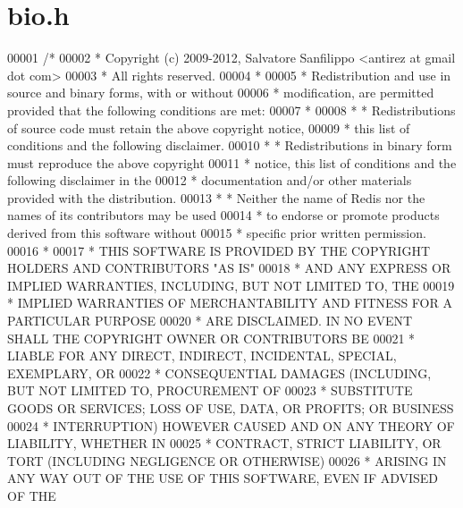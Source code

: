 \hypertarget{bio_8h_source}{}\section{bio.\+h}
\label{bio_8h_source}

\begin{DoxyCode}
00001 \textcolor{comment}{/*}
00002 \textcolor{comment}{ * Copyright (c) 2009-2012, Salvatore Sanfilippo <antirez at gmail dot com>}
00003 \textcolor{comment}{ * All rights reserved.}
00004 \textcolor{comment}{ *}
00005 \textcolor{comment}{ * Redistribution and use in source and binary forms, with or without}
00006 \textcolor{comment}{ * modification, are permitted provided that the following conditions are met:}
00007 \textcolor{comment}{ *}
00008 \textcolor{comment}{ *   * Redistributions of source code must retain the above copyright notice,}
00009 \textcolor{comment}{ *     this list of conditions and the following disclaimer.}
00010 \textcolor{comment}{ *   * Redistributions in binary form must reproduce the above copyright}
00011 \textcolor{comment}{ *     notice, this list of conditions and the following disclaimer in the}
00012 \textcolor{comment}{ *     documentation and/or other materials provided with the distribution.}
00013 \textcolor{comment}{ *   * Neither the name of Redis nor the names of its contributors may be used}
00014 \textcolor{comment}{ *     to endorse or promote products derived from this software without}
00015 \textcolor{comment}{ *     specific prior written permission.}
00016 \textcolor{comment}{ *}
00017 \textcolor{comment}{ * THIS SOFTWARE IS PROVIDED BY THE COPYRIGHT HOLDERS AND CONTRIBUTORS "AS IS"}
00018 \textcolor{comment}{ * AND ANY EXPRESS OR IMPLIED WARRANTIES, INCLUDING, BUT NOT LIMITED TO, THE}
00019 \textcolor{comment}{ * IMPLIED WARRANTIES OF MERCHANTABILITY AND FITNESS FOR A PARTICULAR PURPOSE}
00020 \textcolor{comment}{ * ARE DISCLAIMED. IN NO EVENT SHALL THE COPYRIGHT OWNER OR CONTRIBUTORS BE}
00021 \textcolor{comment}{ * LIABLE FOR ANY DIRECT, INDIRECT, INCIDENTAL, SPECIAL, EXEMPLARY, OR}
00022 \textcolor{comment}{ * CONSEQUENTIAL DAMAGES (INCLUDING, BUT NOT LIMITED TO, PROCUREMENT OF}
00023 \textcolor{comment}{ * SUBSTITUTE GOODS OR SERVICES; LOSS OF USE, DATA, OR PROFITS; OR BUSINESS}
00024 \textcolor{comment}{ * INTERRUPTION) HOWEVER CAUSED AND ON ANY THEORY OF LIABILITY, WHETHER IN}
00025 \textcolor{comment}{ * CONTRACT, STRICT LIABILITY, OR TORT (INCLUDING NEGLIGENCE OR OTHERWISE)}
00026 \textcolor{comment}{ * ARISING IN ANY WAY OUT OF THE USE OF THIS SOFTWARE, EVEN IF ADVISED OF THE}

\end{DoxyCode}

